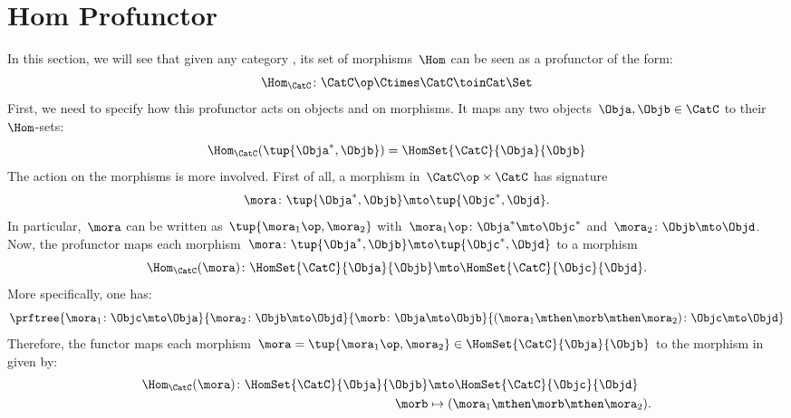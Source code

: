 
\section{Hom Profunctor}


In this section, we will see that given any category \CatC, its set of morphisms~$\Hom$ can be seen as a profunctor of the form:
\begin{equation}
    \label{eq:hom-signature}
    \Hom_\CatC\colon \CatC \op \Ctimes \CatC \toinCat \Set
\end{equation}
First, we need to specify how this profunctor acts on objects and on morphisms.
It maps any two objects~$\Obja,\Objb\in \CatC$ to their~$\Hom$-sets:
\begin{equation}
    \label{eq:hom-action}
    \Hom_\CatC(\tup{\Obja^*,\Objb})=\HomSet{\CatC}{\Obja}{\Objb}
\end{equation}
The action on the morphisms is more involved.
First of all, a morphism in~$\CatC\op \times \CatC$ has signature~
\begin{equation}
    \label{eq:hom0}
    \mora \colon \tup{\Obja^*,\Objb}\mto \tup{\Objc^*, \Objd}.
\end{equation}
%
In particular,~$\mora$ can be written as~$\tup{\mora_1\op,\mora_2}$ with~$\mora_1\op\colon \Obja^*\mto \Objc^*$ and~$\mora_2\colon \Objb\mto \Objd$.
Now, the profunctor maps each morphism~$\mora \colon \tup{\Obja^*,\Objb}\mto \tup{\Objc^*, \Objd}$ to a morphism
%
\begin{equation}
    \label{eq:hom2}
    \Hom_\CatC(\mora)\colon \HomSet{\CatC}{\Obja}{\Objb}\mto \HomSet{\CatC}{\Objc}{\Objd}.
\end{equation}
%
More specifically, one has:
%
\begin{equation}
    \label{eq:hom3}
    \prftree{\mora_1\colon \Objc \mto \Obja}{\mora_2\colon \Objb\mto \Objd}{\morb\colon \Obja\mto \Objb}{(\mora_1\mthen \morb \mthen \mora_2)\colon \Objc\mto \Objd}
\end{equation}
%
Therefore, the functor maps each morphism~$\mora=\tup{\mora_1\op,\mora_2}\in \HomSet{\CatC}{\Obja}{\Objb}$ to the morphism in \Set given by:
%
\begin{equation}
    \label{eq:hom4}
    \begin{aligned}
        \Hom_\CatC(\mora)\colon \HomSet{\CatC}{\Obja}{\Objb} & \mto \HomSet{\CatC}{\Objc}{\Objd}             \\
        \morb                                                & \mapsto (\mora_1\mthen \morb \mthen \mora_2).
    \end{aligned}
\end{equation}
%

